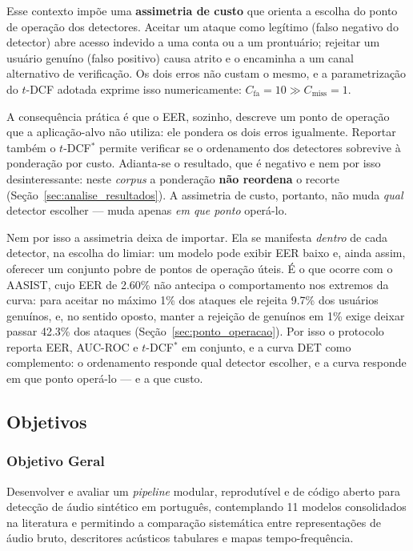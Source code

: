 \documentclass[12pt,a4paper]{article}
\begin{document}
Esse contexto impõe uma \textbf{assimetria de custo} que orienta a escolha do
ponto de operação dos detectores. Aceitar um ataque como legítimo (falso
negativo do detector) abre acesso indevido a uma conta ou a um prontuário;
rejeitar um usuário genuíno (falso positivo) causa atrito e o encaminha a um
canal alternativo de verificação. Os dois erros não custam o mesmo, e a
parametrização do $t$-DCF adotada exprime isso numericamente:
$C_{\text{fa}} = 10 \gg C_{\text{miss}} = 1$.

A consequência prática é que o EER, sozinho, descreve um ponto de operação que
a aplicação-alvo não utiliza: ele pondera os dois erros igualmente. Reportar
também o $t$-DCF$^\ast$ permite verificar se o ordenamento dos detectores
sobrevive à ponderação por custo. Adianta-se o resultado, que é negativo e nem
por isso desinteressante: neste \textit{corpus} a ponderação
\textbf{não reordena} o recorte (Seção~\ref{sec:analise_resultados}). A
assimetria de custo, portanto, não muda \emph{qual} detector escolher --- muda
apenas \emph{em que ponto} operá-lo.

Nem por isso a assimetria deixa de importar. Ela se manifesta \emph{dentro} de
cada detector, na escolha do limiar: um modelo pode exibir EER baixo e, ainda
assim, oferecer um conjunto pobre de pontos de operação úteis. É o que ocorre
com o AASIST, cujo EER de \num{2,60}\% não antecipa o comportamento nos
extremos da curva: para aceitar no máximo \num{1}\% dos ataques ele rejeita
\num{9,7}\% dos usuários genuínos, e, no sentido oposto, manter a rejeição de
genuínos em \num{1}\% exige deixar passar \num{42,3}\% dos ataques
(Seção~\ref{sec:ponto_operacao}). Por isso o protocolo reporta EER, AUC-ROC e
$t$-DCF$^\ast$ em conjunto, e a curva DET como complemento: o ordenamento
responde qual detector escolher, e a curva responde em que ponto operá-lo ---
e a que custo.

\newpage

\subsection{Objetivos}

\subsubsection{Objetivo Geral}

Desenvolver e avaliar um \textit{pipeline} modular, reprodutível e de código
aberto para detecção de áudio sintético em português, contemplando
\num{11} modelos consolidados na literatura e permitindo a comparação
sistemática entre representações de áudio bruto, descritores acústicos
tabulares e mapas tempo-frequência.
\end{document}
